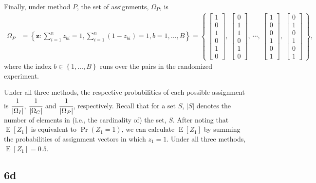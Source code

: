 \documentclass[
  12pt,
  leqno]{article}
\DeclareMathOperator{\E}{\mathrm{E}}
\DeclareMathOperator{\1}{\mathbbm{1}}
\begin{document}
Finally, under method \(P\), the set of assignments, \(\Omega_P\), is
\begin{align*}
\Omega_{P} & = \left\{ \mathbf{z}: \sum \limits_{i = 1}^n z_{bi} = 1, \sum \limits_{i = 1}^n \left(1 - z_{bi}\right) = 1, b = 1, \dots , B \right\} = \left\{ \ \begin{bmatrix} 1 \\ 0 \\ 1 \\ 0 \\ 1 \\ 0 \end{bmatrix}, \ \begin{bmatrix} 0 \\ 1 \\ 1 \\ 0 \\ 1 \\ 0 \end{bmatrix}, \ \cdots , \ \begin{bmatrix} 1 \\ 0 \\ 0 \\ 1 \\ 0 \\ 1  \end{bmatrix}, \ \begin{bmatrix} 0 \\ 1 \\ 0 \\ 1 \\ 0 \\ 1  \end{bmatrix} \ \right\},
\end{align*} where the index \(b \in \left\{1, \dots , B\right\}\) runs
over the pairs in the randomized experiment.

Under all three methods, the respective probabilities of each possible
assignment is \(\cfrac{1}{\left\lvert \Omega_I \right \rvert}\),
\(\cfrac{1}{\left\lvert \Omega_C \right \rvert}\) and
\(\cfrac{1}{\left\lvert \Omega_P \right \rvert}\), respectively. Recall
that for a set \(S\), \(\left\lvert S \right\rvert\) denotes the number
of elements in (i.e., the cardinality of) the set, \(S\). After noting
that \(\E\left[Z_1\right]\) is equivalent to
\(\Pr\left(Z_1 = 1\right)\), we can calculate \(\E\left[Z_1\right]\) by
summing the probabilities of assignment vectors in which \(z_1 = 1\).
Under all three methods, \(\E\left[Z_1\right] = 0.5\).

\subsection*{6d}
\end{document}
